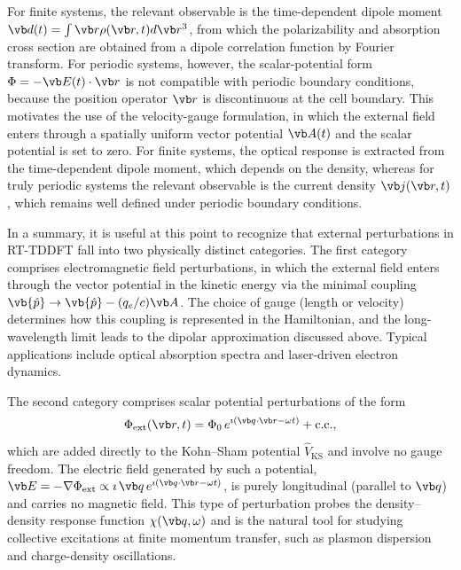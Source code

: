 For finite systems, the relevant observable is the time-dependent dipole moment 
$  {\vb d}(t) = \int \vb r\rho(\vb r,t) d\vb r^3$, 
from which the polarizability and absorption cross section are obtained from  a dipole correlation function  by Fourier transform.
For periodic systems, however, the scalar-potential form $\Phi = -\vb E(t)\cdot\vb r$ is not compatible with
periodic boundary conditions, because the position operator $\vb r$ is discontinuous at the cell boundary.
This motivates the use of the velocity-gauge formulation, in which the external field enters through a spatially
uniform vector potential $\vb A(t)$ and the scalar potential is set to zero.
For finite systems, the optical response is extracted from the time-dependent dipole moment, which depends
on the density, whereas for truly periodic systems the relevant observable is the current density
$\vb j(\vb r,t)$, which remains well defined under periodic boundary conditions.



In a summary, it is useful at this point to recognize that external
perturbations in RT-TDDFT fall into two physically distinct categories.
The first category comprises electromagnetic field
perturbations, in which the external field enters through
the vector potential in the kinetic energy via the minimal
coupling $\vb{\hat p} \to \vb{\hat p} - (q_e/c)\vb A$.
The choice of gauge (length or velocity) determines how
this coupling is represented in the Hamiltonian, and the
long-wavelength limit leads to the dipolar approximation
discussed above.
Typical applications include optical absorption spectra
and laser-driven electron dynamics.

The second category comprises scalar potential
perturbations of the form
\begin{equation}
  \Phi_{\mathrm{ext}}(\vb r,t)
  = \Phi_0\, e^{\imath(\vb q\cdot\vb r - \omega t)}
    + \text{c.c.},
  \label{eq:scalar_probe}
\end{equation}
which are added directly to the Kohn--Sham potential
$\hat V_{\mathrm{KS}}$ and involve no gauge freedom.
The electric field generated by such a potential,
$\vb E = -\nabla\Phi_{\mathrm{ext}}
\propto \imath\,\vb q\, e^{\imath(\vb q\cdot\vb r - \omega t)}$,
is purely longitudinal (parallel to $\vb q$) and carries
no magnetic field.
This type of perturbation probes the density--density
response function $\chi(\vb q,\omega)$ and is the
natural tool for studying collective excitations at
finite momentum transfer, such as plasmon dispersion
and charge-density oscillations.

